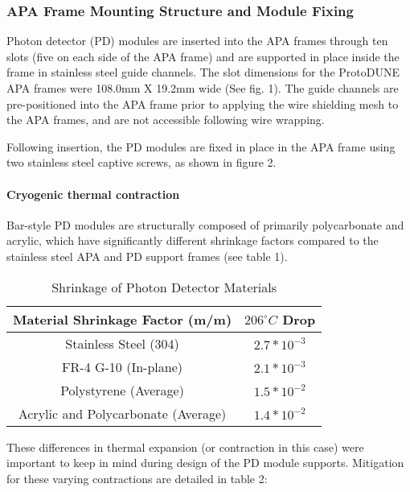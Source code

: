 \subsubsection{APA Frame Mounting Structure and Module Fixing}	
Photon detector (PD) modules are inserted into the APA frames through ten slots 
(five on each side of the APA frame) and are supported in place inside the frame in 
stainless steel guide channels.  The slot dimensions for the ProtoDUNE APA frames 
were 108.0mm X 19.2mm wide (See fig. 1).  The guide channels are pre-positioned into 
the APA frame prior to applying the wire shielding mesh to the APA frames, and are
not accessible following wire wrapping.


Following insertion, the PD modules are fixed in place in the APA frame using
 two stainless steel captive screws, as shown in figure 2.


\paragraph{Cryogenic thermal contraction}

Bar-style PD modules are structurally composed of primarily polycarbonate and 
acrylic, which have significantly different shrinkage factors compared to the 
stainless steel APA and PD support frames (see table 1).


\begin{table}[h!]
\label{tbl:fdsfpdshrink}
\begin{center}
\caption{Shrinkage of Photon Detector Materials}
\begin{tabular}{|c|c|}
\hline
\textbf{Material Shrinkage Factor (m/m)} & \textbf{$206^{\circ}C$ Drop}\\
\hline
Stainless Steel (304) & $2.7*10^{-3}$\\
FR-4 G-10 (In-plane) & $2.1*10^{-3}$\\
Polystyrene (Average) & $1.5*10^{-2}$\\
Acrylic and Polycarbonate (Average) & $1.4*10^{-2}$\\
\hline
\end{tabular}
\end{center}
\end{table}

These differences in thermal expansion (or contraction in this case) were 
important to keep in mind during design of the PD module supports.  
Mitigation for these varying contractions are detailed in table 2:

